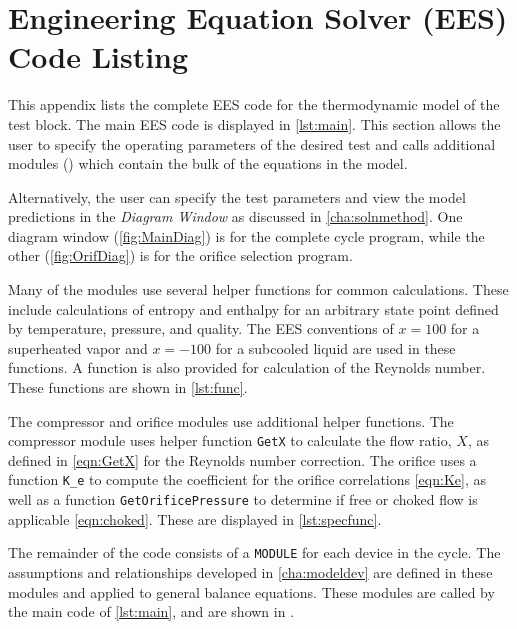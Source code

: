 \chapter{Engineering Equation Solver (EES) Code Listing} \label{app:code}

This appendix lists the complete EES code for the thermodynamic model of the test block.
The main EES code is displayed in \cref{lst:main}. This section allows the user to specify
the operating parameters of the desired test and calls additional modules
() 
which contain 
the bulk of the equations in the model. 


Alternatively, the user can specify the test parameters and view the model 
predictions in the \emph{Diagram Window} as discussed in \cref{cha:solnmethod}.
One diagram window (\cref{fig:MainDiag}) is for  the complete cycle program,
while the other (\cref{fig:OrifDiag}) is for the orifice selection program.

Many of the modules use several helper functions for common calculations.
These include calculations of entropy and enthalpy for an arbitrary state point
defined by temperature, pressure, and quality. The EES conventions of $x=100$ for
a superheated vapor and $x=-100$ for a subcooled liquid are used in these functions.
A function is also provided for calculation of the Reynolds number.
These functions are shown in \cref{lst:func}.


The compressor and orifice modules use additional helper functions.
The compressor module uses helper function \verb+GetX+ to calculate the flow ratio, $X$,
as defined in \cref{eqn:GetX} for the Reynolds number correction.
The orifice uses a function \verb+K_e+ to compute the coefficient for the orifice correlations \cref{eqn:Ke},
as well as a function \verb+GetOrificePressure+ to determine if free or choked flow is applicable \cref{eqn:choked}.
These are displayed in \cref{lst:specfunc}.


The remainder of the code consists of a \verb+MODULE+ for each device in the cycle.
The assumptions and relationships developed in \cref{cha:modeldev} are 
defined in these modules and applied to general balance equations.
These modules are called by the main code of \cref{lst:main}, and are shown in .

